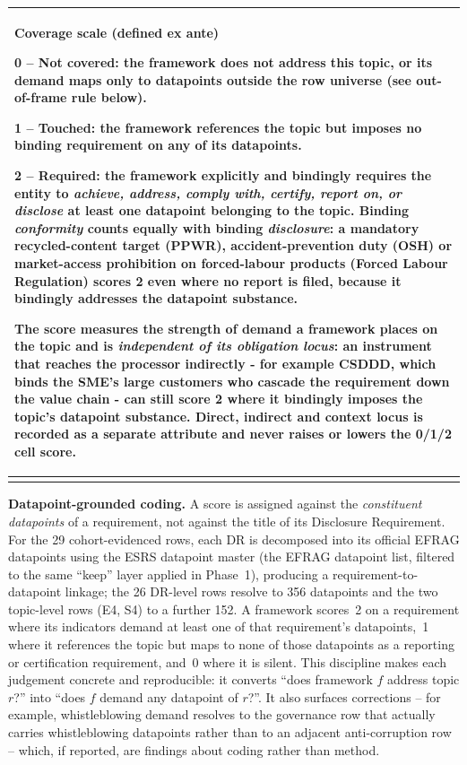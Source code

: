 \documentclass[
]{article}
\newcounter{none} %
\begin{document}
{\def\LTcaptype{none}
\begin{longtable}[]{@{}>{\raggedright\arraybackslash}p{\linewidth}@{}}
\toprule\noalign{}
\begin{minipage}[b]{\linewidth}\raggedright
\textbf{Coverage scale (defined ex ante)}

0 -- Not covered: the framework does not address this topic, or its
demand maps only to datapoints outside the row universe (see
out-of-frame rule below).

1 -- Touched: the framework references the topic but imposes no binding
requirement on any of its datapoints.

2 -- Required: the framework explicitly and bindingly requires the entity
to \emph{achieve, address, comply with, certify, report on, or disclose}
at least one datapoint belonging to the topic. Binding \emph{conformity}
counts equally with binding \emph{disclosure}: a mandatory
recycled-content target (PPWR), accident-prevention duty (OSH) or
market-access prohibition on forced-labour products (Forced Labour
Regulation) scores 2 even where no report is filed, because it bindingly
addresses the datapoint substance.

The score measures the strength of demand a framework places on the topic
and is \emph{independent of its obligation locus}: an instrument that
reaches the processor indirectly - for example CSDDD, which binds the
SME's large customers who cascade the requirement down the value chain - can still score 2 where it bindingly imposes the topic's datapoint
substance. Direct, indirect and context
locus is recorded as a separate attribute and never raises or lowers the
0/1/2 cell score.
\end{minipage} \\
\midrule\noalign{}
\endhead
\bottomrule\noalign{}
\endlastfoot
\end{longtable}}

\textbf{Datapoint-grounded coding.} A score is assigned against the
\emph{constituent datapoints} of a requirement, not against the title of
its Disclosure Requirement. For the 29 cohort-evidenced rows, each DR is
decomposed into its official EFRAG datapoints using the ESRS datapoint
master (the EFRAG datapoint list, filtered to the same ``keep'' layer
applied in Phase~1), producing a requirement-to-datapoint linkage; the 26
DR-level rows resolve to 356 datapoints and the two topic-level rows (E4,
S4) to a further 152. A framework scores~2 on a requirement where its
indicators demand at least one of that requirement's datapoints,~1 where
it references the topic but maps to none of those datapoints as a
reporting or certification requirement, and~0 where it is silent. This
discipline makes each judgement concrete and reproducible: it converts
``does framework $f$ address topic $r$?'' into ``does $f$ demand any
datapoint of $r$?''. It also surfaces corrections -- for
example, whistleblowing demand resolves to the governance row that
actually carries whistleblowing datapoints rather than to an adjacent
anti-corruption row -- which, if reported, are findings about coding
rather than method.
\end{document}
